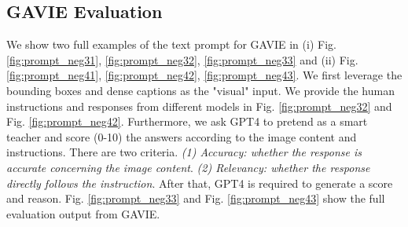 \subsection{GAVIE Evaluation}
We show two full examples of the text prompt for GAVIE in (i) Fig. \ref{fig:prompt_neg31}, \ref{fig:prompt_neg32}, \ref{fig:prompt_neg33} and (ii) Fig. \ref{fig:prompt_neg41}, \ref{fig:prompt_neg42}, \ref{fig:prompt_neg43}. We first leverage the bounding boxes and dense captions as the "visual" input. We provide the human instructions and responses from different models in Fig. \ref{fig:prompt_neg32} and Fig. \ref{fig:prompt_neg42}. Furthermore, we ask GPT4 to pretend as a smart teacher and score (0-10) the answers according to the image content and instructions. There are two criteria. \textit{(1) Accuracy: whether the response is accurate concerning the image content}. \textit{(2) Relevancy: whether the response directly follows the instruction}. After that, GPT4 is required to generate a score and reason. Fig. \ref{fig:prompt_neg33}  and Fig. \ref{fig:prompt_neg43} show the full evaluation output from GAVIE.


